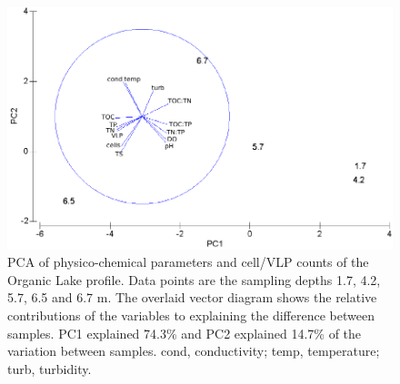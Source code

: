 \begin{figure}
\includegraphics[width=\textwidth]{orglake_figures/pca.pdf}
\caption[\acs{PCA} of physico-chemical parameters]{\acs{PCA} of physico-chemical parameters and cell/\ac{VLP} counts of the Organic Lake profile. Data points are the sampling depths 1.7, 4.2, 5.7, 6.5 and 6.7 m. The overlaid vector diagram shows the relative contributions of the variables to explaining the difference between samples. PC1 explained 74.3\% and PC2 explained 14.7\% of the variation between samples. cond, conductivity; temp, temperature; turb, turbidity.}
\label{fig:pca}

\end{figure}
